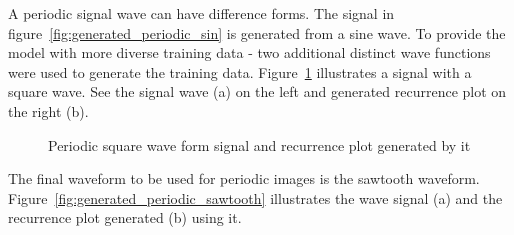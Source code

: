 \documentclass[a4paper,12pt,fleqn]{article}
\begin{document}
A periodic signal wave can have difference forms.
The signal in figure~\ref{fig:generated_periodic_sin} is generated from a sine wave.
To provide the model with more diverse training data - two additional distinct wave functions were used to generate the training data.
Figure~\ref{fig:generated_periodic_square} illustrates a signal with a square wave. See the signal wave (a) on the left and generated recurrence plot on the right (b).
\begin{figure}
  \centering
  \qquad
  \caption{Periodic square wave form signal and recurrence plot generated by it}
  \label{fig:generated_periodic_square}
\end{figure}
The final waveform to be used for periodic images is the sawtooth waveform.
Figure~\ref{fig:generated_periodic_sawtooth} illustrates the wave signal (a) and the recurrence plot generated (b) using it.
\end{document}
